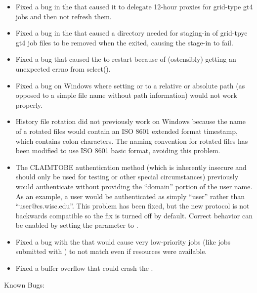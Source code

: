 \begin{itemize}
\item Fixed a bug in the  that caused it to delegate
12-hour proxies for grid-type gt4 jobs and then not refresh them.

\item Fixed a bug in the  that caused a directory
needed for staging-in of grid-tpye gt4 job files to be removed when
the  exited, causing the stage-in to fail.

\item Fixed a bug that caused the  to restart
because of (ostensibly) getting an unexpected errno from select().

\item Fixed a bug on Windows where setting  or
 to a relative or absolute path (as opposed to a
simple file name without path information) would not work properly.

\item History file rotation did not previously work on Windows because
the name of a rotated files would contain an ISO 8601 extended format
timestamp, which contains colon characters. The naming convention for
rotated files has been modified to use ISO 8601 basic format, avoiding
this problem.

\item The CLAIMTOBE authentication method (which is inherently
insecure and should only be used for testing or other special
circumstances) previously would authenticate without providing the
``domain'' portion of the user name. As an example, a user would be
authenticated as simply ``user'' rather than
``user@cs.wisc.edu''. This problem has been fixed, but the new
protocol is not backwards compatible so the fix is turned off by
default. Correct behavior can be enabled by setting the
 parameter to .

\item Fixed a bug with the  that
would cause very low-priority jobs (like jobs submitted with
) to not match even if resources were available.

\item Fixed a buffer overflow that could crash the .

\end{itemize}

\noindent Known Bugs:

